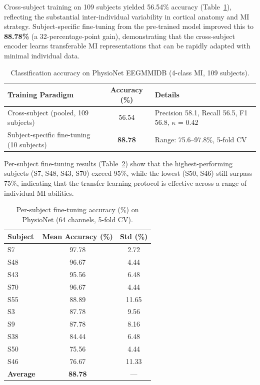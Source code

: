 \documentclass[12pt, a4paper]{article}
\begin{document}
Cross-subject training on 109 subjects yielded 56.54\% accuracy (Table~\ref{tab:physionet_results}), reflecting the substantial inter-individual variability in cortical anatomy and MI strategy. Subject-specific fine-tuning from the pre-trained model improved this to \textbf{88.78\%} (a 32-percentage-point gain), demonstrating that the cross-subject encoder learns transferable MI representations that can be rapidly adapted with minimal individual data.

\begin{table}[htbp]
\centering
\caption{Classification accuracy on PhysioNet EEGMMIDB (4-class MI, 109 subjects).}
\label{tab:physionet_results}
\begin{tabular}{@{} l c >{\raggedright\arraybackslash}p{6.5cm} @{}}
\toprule
\textbf{Training Paradigm} & \textbf{Accuracy (\%)} & \textbf{Details} \\
\midrule
Cross-subject (pooled, 109 subjects) & 56.54 & Precision 58.1, Recall 56.5, F1 56.8, $\kappa$ = 0.42 \\
Subject-specific fine-tuning (10 subjects) & \textbf{88.78} & Range: 75.6--97.8\%, 5-fold CV \\
\bottomrule
\end{tabular}
\end{table}

Per-subject fine-tuning results (Table~\ref{tab:finetune_detail}) show that the highest-performing subjects (S7, S48, S43, S70) exceed 95\%, while the lowest (S50, S46) still surpass 75\%, indicating that the transfer learning protocol is effective across a range of individual MI abilities.

\begin{table}[htbp]
\centering
\caption{Per-subject fine-tuning accuracy (\%) on PhysioNet (64 channels, 5-fold CV).}
\label{tab:finetune_detail}
\begin{tabular}{lcc}
\toprule
\textbf{Subject} & \textbf{Mean Accuracy (\%)} & \textbf{Std (\%)} \\
\midrule
S7  & 97.78 & 2.72 \\
S48 & 96.67 & 4.44 \\
S43 & 95.56 & 6.48 \\
S70 & 96.67 & 4.44 \\
S55 & 88.89 & 11.65 \\
S3  & 87.78 & 9.56 \\
S9  & 87.78 & 8.16 \\
S38 & 84.44 & 6.48 \\
S50 & 75.56 & 4.44 \\
S46 & 76.67 & 11.33 \\
\midrule
\textbf{Average} & \textbf{88.78} & --- \\
\bottomrule
\end{tabular}
\end{table}
\end{document}
